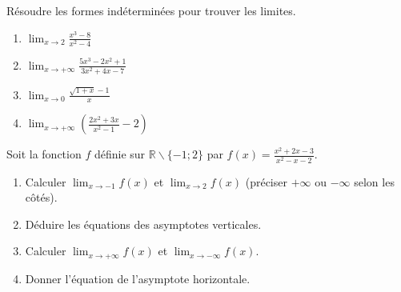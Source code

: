 \documentclass[11pt]{article}
\def\setminus{\mathbin{\backslash}}\let\smallsetminus\setminus
\begin{document}
\begin{exercice}
Résoudre les formes indéterminées pour trouver les limites.
\begin{enumerate}
    \item $\lim_{x\to 2}\frac{x^3-8}{x^2-4}$
    \item $\lim_{x\to +\infty}\frac{5x^3-2x^2+1}{3x^2+4x-7}$
    \item $\lim_{x\to 0}\frac{\sqrt{1+x}-1}{x}$
    \item $\lim_{x\to +\infty}\left(\frac{2x^2+3x}{x^2-1}-2\right)$
\end{enumerate}
\end{exercice}

\begin{exercice}
Soit la fonction $f$ définie sur $\mathbb{R}\setminus\{-1; 2\}$ par $f(x)=\frac{x^2+2x-3}{x^2-x-2}$.
\begin{enumerate}
    \item Calculer $\lim_{x\to -1}f(x)$ et $\lim_{x\to 2}f(x)$ (préciser $+\infty$ ou $-\infty$ selon les côtés).
    \item Déduire les équations des asymptotes verticales.
    \item Calculer $\lim_{x\to +\infty}f(x)$ et $\lim_{x\to -\infty}f(x)$.
    \item Donner l'équation de l'asymptote horizontale.
\end{enumerate}
\end{exercice}
\end{document}
